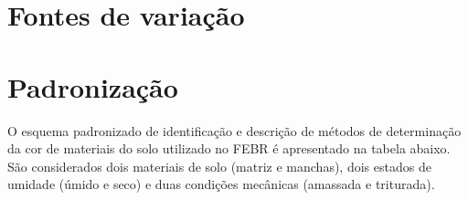 \documentclass[
  a4paper,
  dvipsnames]{tufte-book}
\begin{document}
\hypertarget{fontes-de-variauxe7uxe3o}{%
\section{Fontes de variação}\label{fontes-de-variauxe7uxe3o}}

\hypertarget{padronizauxe7uxe3o}{%
\section{Padronização}\label{padronizauxe7uxe3o}}

O esquema padronizado de identificação e descrição de métodos de determinação da cor de materiais do solo utilizado no FEBR é apresentado na tabela abaixo. São considerados dois materiais de solo (matriz e manchas), dois estados de umidade (úmido e seco) e duas condições mecânicas (amassada e triturada).
\end{document}
